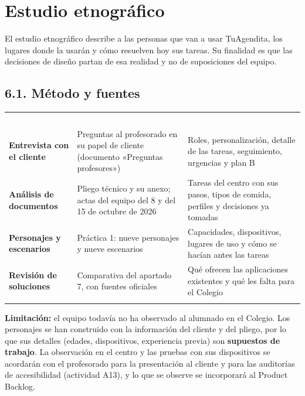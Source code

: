 \documentclass[11pt,a4paper]{article}
\newcommand{\hl}[1]{\textcolor{gblue}{\textbf{#1}}}
\begin{document}
\section{Estudio etnográfico}
El estudio etnográfico describe a las personas que van a usar TuAgendita, los lugares donde la usarán y cómo resuelven hoy sus tareas. Su finalidad es que las decisiones de diseño partan de esa realidad y no de suposiciones del equipo.

\subsection*{6.1. Método y fuentes}
{\small\par\noindent\begin{tabular}{@{}>{\raggedright\arraybackslash}p{}>{\raggedright\arraybackslash}p{}>{\raggedright\arraybackslash}p{}@{}}
\rowcolor{gblue}\textcolor{white}{\textbf{Técnica}} & \textcolor{white}{\textbf{Fuente}} & \textcolor{white}{\textbf{Qué aporta}} \\
\hl{Entrevista con el cliente} & Preguntas al profesorado en su papel de cliente (documento «Preguntas profesores») & Roles, personalización, detalle de las tareas, seguimiento, urgencias y plan B \\ \arrayrulecolor{gline}\hline
\rowcolor{glight}
\hl{Análisis de documentos} & Pliego técnico y su anexo; actas del equipo del 8 y del 15 de octubre de 2026 & Tareas del centro con sus pasos, tipos de comida, perfiles y decisiones ya tomadas \\ \arrayrulecolor{gline}\hline
\hl{Personajes y escenarios} & Práctica 1: nueve personajes y nueve escenarios & Capacidades, dispositivos, lugares de uso y cómo se hacían antes las tareas \\ \arrayrulecolor{gline}\hline
\rowcolor{glight}
\hl{Revisión de soluciones} & Comparativa del apartado 7, con fuentes oficiales & Qué ofrecen las aplicaciones existentes y qué les falta para el Colegio \\ \arrayrulecolor{gline}\hline
\end{tabular}\par}\medskip

\hl{Limitación:} el equipo todavía no ha observado al alumnado en el Colegio. Los personajes se han construido con la información del cliente y del pliego, por lo que sus detalles (edades, dispositivos, experiencia previa) son \hl{supuestos de trabajo}. La observación en el centro y las pruebas con sus dispositivos se acordarán con el profesorado para la presentación al cliente y para las auditorías de accesibilidad (actividad A13), y lo que se observe se incorporará al Product Backlog.
\end{document}
